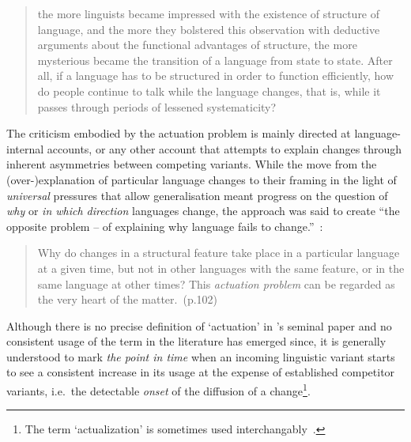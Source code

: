 \begin{quote}
the more linguists became impressed with the existence of structure of language, and the more they bolstered this observation with deductive arguments about the functional advantages of structure, the more mysterious became the transition of a language from state to state. After all, if a language has to be structured in order to function efficiently, how do people continue to talk while the language changes, that is, while it passes through periods of lessened systematicity?~\citep[p.100]{Weinreich1968}
\end{quote}

The criticism embodied by the actuation problem is mainly directed at language-internal accounts, or any other account that attempts to explain changes through inherent asymmetries between competing variants.
While the move from the (over-)explanation of particular language changes to their framing in the light of \emph{universal} pressures that allow generalisation meant progress on the question of \emph{why} or \emph{in which direction} languages change, the approach was said to create ``the opposite problem -- of explaining why language fails to change.''~\citep[p.112]{Weinreich1968}:

\begin{quote}
Why do changes in a structural feature take place in a particular language at a given time, but not in other languages with the same feature, or in the same language at other times? This \emph{actuation problem} can be regarded as the very heart of the matter.~(p.102)
\end{quote}

Although there is no precise definition of `actuation' in \citeauthor{Weinreich1968}'s seminal paper and no consistent usage of the term in the literature has emerged since, it is generally understood to mark \emph{the point in time} when an incoming linguistic variant starts to see a consistent increase in its usage at the expense of established competitor variants, i.e.~the detectable \emph{onset} of the diffusion of a change\footnote{The term `actualization' \citep[with a specific meaning in grammaticalisation theory, see][p.24]{Traugott2011} is sometimes used interchangably~\citep{Andersen2008,Kiparsky2014}.}.


